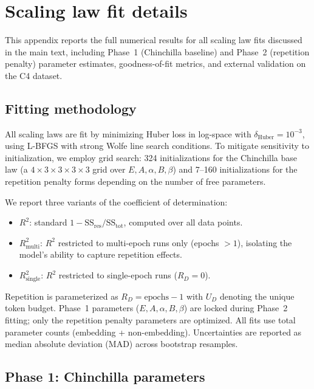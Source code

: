 \section{Scaling law fit details}
\label{app:fit_details}

This appendix reports the full numerical results for all scaling law fits discussed in the main text, including Phase~1 (Chinchilla baseline) and Phase~2 (repetition penalty) parameter estimates, goodness-of-fit metrics, and external validation on the \citet{muennighoff2023scaling} C4 dataset.

\subsection{Fitting methodology}

All scaling laws are fit by minimizing Huber loss in log-space with $\delta_{\text{Huber}} = 10^{-3}$, using L-BFGS with strong Wolfe line search conditions.
To mitigate sensitivity to initialization, we employ grid search: 324 initializations for the Chinchilla base law (a $4 \times 3 \times 3 \times 3 \times 3$ grid over $E, A, \alpha, B, \beta$) and 7--160 initializations for the repetition penalty forms depending on the number of free parameters.

We report three variants of the coefficient of determination:
\begin{itemize}
    \item $R^2$: standard $1 - \text{SS}_{\text{res}} / \text{SS}_{\text{tot}}$, computed over all data points.
    \item $R^2_{\text{multi}}$: $R^2$ restricted to multi-epoch runs only (epochs $> 1$), isolating the model's ability to capture repetition effects.
    \item $R^2_{\text{single}}$: $R^2$ restricted to single-epoch runs ($R_D = 0$). 
\end{itemize}

Repetition is parameterized as $R_D = \text{epochs} - 1$ with $U_D$ denoting the unique token budget.
Phase~1 parameters ($E, A, \alpha, B, \beta$) are locked during Phase~2 fitting; only the repetition penalty parameters are optimized.
All fits use total parameter counts (embedding + non-embedding).
Uncertainties are reported as median absolute deviation (MAD) across bootstrap resamples. 

\subsection{Phase 1: Chinchilla parameters}

